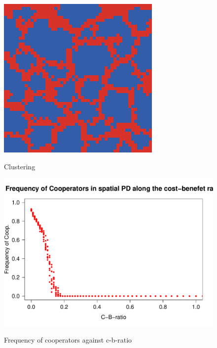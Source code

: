 \documentclass[DIV=calc, paper=a4, fontsize=11pt, twocolumn]{scrartcl}	 %
\begin{document}
\begin{figure}[here]
\centering
\begin{minipage}{.35\textwidth}
  \centering
  \includegraphics[width=1\linewidth]{PDspatial8cost01}
 \caption{}{Clustering}
\label{fig:PDspatialcluster}
\end{minipage}%
\end{figure}

\begin{figure}
\begin{minipage}{.48\textwidth}
  \centering
  \includegraphics[width=1\linewidth]{PDspatial}
 \caption{}{Frequency of cooperators against c-b-ratio}
  \label{fig:PDspatialfreq}
\end{minipage}
\end{figure}
\end{document}
